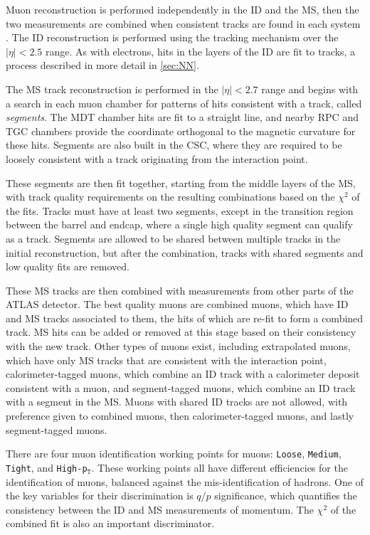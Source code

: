 Muon reconstruction is performed independently in the \ac{ID} and the \ac{MS}, then the two measurements are combined when consistent tracks are found in each system \cite{1603.05598}. The \ac{ID} reconstruction is performed using the tracking mechanism over the $|\eta|<2.5$ range. As with electrons, hits in the layers of the \ac{ID} are fit to tracks, a process described in more detail in \autoref{sec:NN}.

The \ac{MS} track reconstruction is performed in the $|\eta|<2.7$ range and begins with a search in each muon chamber for patterns of hits consistent with a track, called \textit{segments}. The \ac{MDT} chamber hits are fit to a straight line, and nearby \ac{RPC} and \ac{TGC} chambers provide the coordinate orthogonal to the magnetic curvature for these hits. Segments are also built in the \ac{CSC}, where they are required to be loosely consistent with a track originating from the interaction point. 

These segments are then fit together, starting from the middle layers of the \ac{MS}, with track quality requirements on the resulting combinations based on the $\chi^2$ of the fits. Tracks must have at least two segments, except in the transition region between the barrel and endcap, where a single high quality segment can qualify as a track. Segments are allowed to be shared between multiple tracks in the initial reconstruction, but after the combination, tracks with shared segments and low quality fits are removed.    

These \ac{MS} tracks are then combined with measurements from other parts of the \ac{ATLAS} detector. The best quality muons are combined muons, which have \ac{ID} and \ac{MS} tracks associated to them, the hits of which are re-fit to form a combined track. \ac{MS} hits can be added or removed at this stage based on their consistency with the new track. Other types of muons exist, including extrapolated muons, which have only \ac{MS} tracks that are consistent with the interaction point, calorimeter-tagged muons, which combine an \ac{ID} track with a calorimeter deposit consistent with a muon, and segment-tagged muons, which combine an \ac{ID} track with a segment in the \ac{MS}. Muons with shared \ac{ID} tracks are not allowed, with preference given to combined muons, then calorimeter-tagged muons, and lastly segment-tagged muons. 

There are four muon identification working points for muons: \texttt{Loose}, \texttt{Medium}, \texttt{Tight}, and \texttt{High-p$_\texttt{T}$}. These working points all have different efficiencies for the identification of muons, balanced against the mis-identification of hadrons. One of the key variables for their discrimination is $q/p$ significance, which quantifies the consistency between the \ac{ID} and \ac{MS} measurements of momentum. The $\chi^2$ of the combined fit is also an important discriminator. 

